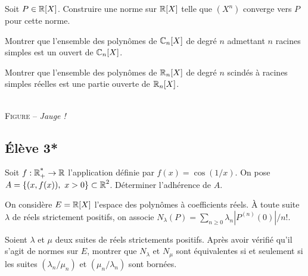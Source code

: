 \documentclass[10pt]{scrartcl}
\begin{document}
    \begin{exo}
        Soit $P\in\operatorname{\mathbb R}[X]$. Construire une norme sur $\operatorname{\mathbb R}[X]$ telle que $(X^n)$ converge vers $P$ pour cette norme.
    \end{exo}

    \begin{exo}
        Montrer que l'ensemble des polynômes de $\operatorname{\mathbb C}_n[X]$ de degré $n$ admettant $n$ racines simples est un ouvert de $\operatorname{\mathbb C}_n[X]$.
    \end{exo}

    \begin{exo}
        Montrer que l'ensemble des polynômes de $\operatorname{\mathbb R}_n[X]$ de degré $n$ scindés à racines simples réelles est une partie ouverte de $\operatorname{\mathbb R}_n[X]$.
    \end{exo}

    \vspace{2em}
    \begin{center}
        \\
        \vspace{10pt}
        \textsc{Figure} – \textit{Jauge !}
    \end{center}

    \newpage
    \subsection*{Élève 3*}
    \begin{exo}
        Soit $f:\operatorname{\mathbb R_+^*}\to\operatorname{\mathbb R}$ l'application définie par $f(x)=\cos(1/x)$. 
        On pose $A=\lbrace (x,f(x)),\ x>0\rbrace\subset\R^2$. Déterminer l'adhérence de $A$.
    \end{exo}

    \begin{exo}
        On considère $E=\operatorname{\mathbb R}[X]$ l'espace des polynômes à coefficients réels. À toute suite $\lambda$ de réels strictement positifs, on associe $N_\lambda(P)=\sum_{n\geq 0}\lambda_n|{P^{(n)}(0)}|/{n!}$.

        Soient $\lambda$ et $\mu$ deux suites de réels strictements positifs. 
        Après avoir vérifié qu'il s'agit de normes sur $E$, montrer que $N_\lambda$ et $N_\mu$ sont équivalentes si et seulement si les suites $(\lambda_n/\mu_n)$ et $(\mu_n/\lambda_n)$ sont bornées.
    \end{exo}
\end{document}
